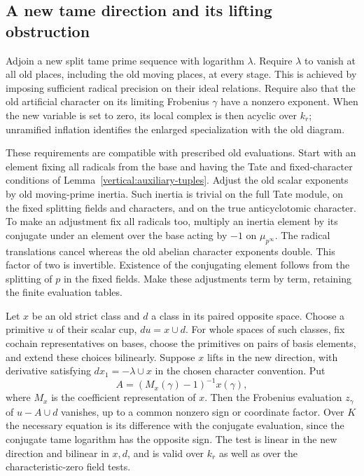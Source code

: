 \subsection{A new tame direction and its lifting obstruction}

Adjoin a new split tame prime sequence with logarithm $\lambda$.
Require $\lambda$ to vanish at all old places, including the old
moving places, at every stage.  This is achieved by imposing
sufficient radical precision on their ideal relations.  Require
also that the old artificial character on its limiting Frobenius
$\gamma$ have a nonzero exponent.  When the new variable is set
to zero, its local complex is then acyclic over $k_r$; unramified
inflation identifies the enlarged specialization with the old
diagram.

These requirements are compatible with prescribed old evaluations.
Start with an element fixing all radicals from the base and having
the Tate and fixed-character conditions of
Lemma~\ref{vertical:auxiliary-tuples}.  Adjust the old scalar
exponents by old moving-prime inertia.  Such inertia is trivial
on the full Tate module, on the fixed splitting fields and
characters, and on the true anticyclotomic character.  To make
an adjustment fix all radicals too, multiply an inertia element
by its conjugate under an element over the base acting by $-1$
on $\mu_{p^\infty}$.  The radical translations cancel whereas
the old abelian character exponents double.  This factor of two
is invertible.  Existence of the conjugating element follows
from the splitting of $p$ in the fixed fields.  Make these
adjustments term by term, retaining the finite evaluation tables.

\begin{lemma}\label{vertical:lift-test}
Let $x$ be an old strict class and $d$ a class in its paired opposite
space.  Choose a primitive $u$ of their scalar cup,
$du=x\cup d$.  For whole spaces of such classes, fix cochain
representatives on bases, choose the primitives on pairs of basis
elements, and extend these choices bilinearly.  Suppose $x$ lifts
in the new direction, with
derivative satisfying $dx_1=-\lambda\cup x$ in the chosen character
convention.  Put
\[
 A=(M_x(\gamma)-1)^{-1}x(\gamma),
\]
where $M_x$ is the coefficient representation of $x$.  Then the
Frobenius evaluation $z_\gamma$ of $u-A\cup d$ vanishes, up to a
common nonzero sign or coordinate factor.  Over $K$ the necessary
equation is its difference with the conjugate evaluation, since
the conjugate tame logarithm has the opposite sign.  The test is
linear in the new direction and bilinear in $x,d$, and is valid
over $k_r$ as well as over the characteristic-zero field tests.
\end{lemma}

